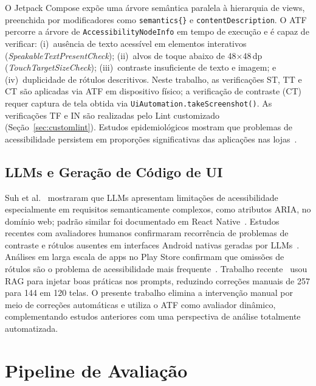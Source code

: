 \documentclass[sigconf,review]{webmedia}
\begin{document}
O Jetpack Compose expõe uma árvore semântica paralela à hierarquia de views,
preenchida por modificadores como \texttt{semantics\{\}} e
\texttt{contentDescription}. O ATF~\cite{google2024atf} percorre a árvore de
\texttt{AccessibilityNodeInfo} em tempo de execução e é capaz de verificar:
(i)~ausência de texto acessível em elementos interativos
(\textit{SpeakableTextPresentCheck}); (ii)~alvos de toque abaixo de
48$\times$48\,dp (\textit{TouchTargetSizeCheck}); (iii)~contraste insuficiente
de texto e imagem; e (iv)~duplicidade de rótulos descritivos. Neste trabalho,
as verificações ST, TT e CT são aplicadas via ATF em dispositivo físico;
a verificação de contraste (CT) requer captura de tela obtida via
\texttt{UiAutomation.takeScreenshot()}. As verificações TF e IN são
realizadas pelo Lint customizado (Seção~\ref{sec:customlint}).
Estudos epidemiológicos mostram que problemas de acessibilidade persistem em
proporções significativas das aplicações nas
lojas~\cite{ross2020epidemiology,fok2022longitudinal}.

\subsection{LLMs e Geração de Código de UI}

Suh et al.~\cite{suh2025human} mostraram que LLMs apresentam limitações de
acessibilidade especialmente em requisitos semanticamente complexos, como
atributos ARIA, no domínio web; padrão similar foi documentado em React
Native~\cite{anonref3}. Estudos recentes com avaliadores humanos
confirmaram recorrência de problemas de contraste e rótulos ausentes em
interfaces Android nativas geradas por LLMs~\cite{anonref1}.
Análises em larga escala de apps no Play Store confirmam que omissões de
rótulos são o problema de acessibilidade mais frequente~\cite{fok2022longitudinal}.
Trabalho recente~\cite{anonref2} usou RAG para injetar boas práticas
nos prompts, reduzindo correções manuais de 257 para 144 em 120 telas. O
presente trabalho elimina a intervenção manual por meio de correções
automáticas e utiliza o ATF como avaliador dinâmico, complementando estudos
anteriores com uma perspectiva de análise totalmente automatizada.

\section{Pipeline de Avaliação}
\label{sec:pipeline}
\end{document}
